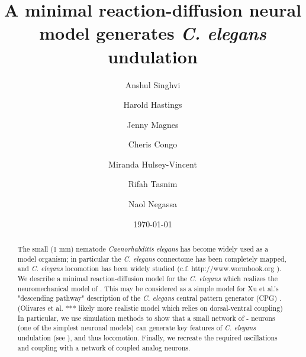 \documentclass[
    11pt,
]{article}
\begin{document}


\title{A minimal reaction-diffusion neural model generates {\emph{C. elegans}} undulation}

\author[1]{Anshul Singhvi}

\author[1,3]{Harold Hastings}

\author[2]{Jenny Magnes}

\author[2]{Cheris Congo}

\author[2]{Miranda Hulsey-Vincent}

\author[1]{Rifah Tasnim}

\author[1]{Naol Negassa}


\date{\today}

\begin{abstract}
    The small (1 mm) nematode \emph{Caenorhabditis elegans} has become widely used as a model organism; in particular the \emph{C. elegans} connectome has been completely mapped, and \emph{C. elegans} locomotion has been widely studied (c.f. http://www.wormbook.org \citet{corsi2015}). We describe a minimal reaction-diffusion model for the \emph{C. elegans} which realizes the neuromechanical model of \citet{izquierdo2018}. This  may be considered as a simple model for Xu et al.'s "descending pathway" description of the \emph{C. elegans} central pattern generator (CPG) \citet{xu2018,wen2012}. (Olivares et al. *** likely more realistic model which relies on dorsal-ventral coupling) In particular, we use simulation methods to show that a small network of \citet{fitzhugh1955}-\citet{nagumo1962} neurons (one of the simplest neuronal models) can generate key features of \emph{C. elegans} undulation (see \citet{magnes2012}), and thus locomotion. Finally, we recreate the required oscillations and coupling with a network of coupled \citet{keener1983} analog neurons. 
\end{abstract}

\maketitle
\end{document}
